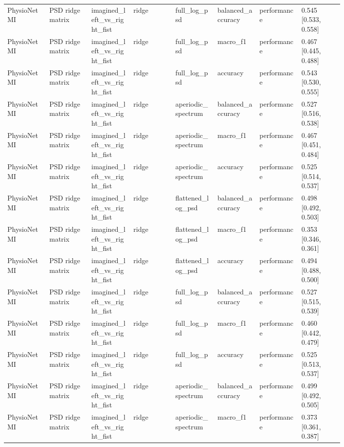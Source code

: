 \begin{longtable}{p{0.10\linewidth}p{0.10\linewidth}p{0.10\linewidth}p{0.10\linewidth}p{0.10\linewidth}p{0.10\linewidth}p{0.10\linewidth}p{0.10\linewidth}}
PhysioNet MI & PSD ridge matrix & imagined\_left\_vs\_right\_fist & ridge & full\_log\_psd & balanced\_accuracy & performance & 0.545 [0.533, 0.558]\\
PhysioNet MI & PSD ridge matrix & imagined\_left\_vs\_right\_fist & ridge & full\_log\_psd & macro\_f1 & performance & 0.467 [0.445, 0.488]\\
PhysioNet MI & PSD ridge matrix & imagined\_left\_vs\_right\_fist & ridge & full\_log\_psd & accuracy & performance & 0.543 [0.530, 0.555]\\
PhysioNet MI & PSD ridge matrix & imagined\_left\_vs\_right\_fist & ridge & aperiodic\_spectrum & balanced\_accuracy & performance & 0.527 [0.516, 0.538]\\
PhysioNet MI & PSD ridge matrix & imagined\_left\_vs\_right\_fist & ridge & aperiodic\_spectrum & macro\_f1 & performance & 0.467 [0.451, 0.484]\\
PhysioNet MI & PSD ridge matrix & imagined\_left\_vs\_right\_fist & ridge & aperiodic\_spectrum & accuracy & performance & 0.525 [0.514, 0.537]\\
PhysioNet MI & PSD ridge matrix & imagined\_left\_vs\_right\_fist & ridge & flattened\_log\_psd & balanced\_accuracy & performance & 0.498 [0.492, 0.503]\\
PhysioNet MI & PSD ridge matrix & imagined\_left\_vs\_right\_fist & ridge & flattened\_log\_psd & macro\_f1 & performance & 0.353 [0.346, 0.361]\\
PhysioNet MI & PSD ridge matrix & imagined\_left\_vs\_right\_fist & ridge & flattened\_log\_psd & accuracy & performance & 0.494 [0.488, 0.500]\\
PhysioNet MI & PSD ridge matrix & imagined\_left\_vs\_right\_fist & ridge & full\_log\_psd & balanced\_accuracy & performance & 0.527 [0.515, 0.539]\\
PhysioNet MI & PSD ridge matrix & imagined\_left\_vs\_right\_fist & ridge & full\_log\_psd & macro\_f1 & performance & 0.460 [0.442, 0.479]\\
PhysioNet MI & PSD ridge matrix & imagined\_left\_vs\_right\_fist & ridge & full\_log\_psd & accuracy & performance & 0.525 [0.513, 0.537]\\
PhysioNet MI & PSD ridge matrix & imagined\_left\_vs\_right\_fist & ridge & aperiodic\_spectrum & balanced\_accuracy & performance & 0.499 [0.492, 0.505]\\
PhysioNet MI & PSD ridge matrix & imagined\_left\_vs\_right\_fist & ridge & aperiodic\_spectrum & macro\_f1 & performance & 0.373 [0.361, 0.387]\\

\end{longtable}
